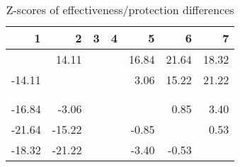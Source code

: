 \begin{table}[ht]
\centering
\begin{tabular}{rrrrrrr}
  \hline
1 & 2 & 3 & 4 & 5 & 6 & 7 \\ 
  \hline
 & 14.11 &  &  & 16.84 & 21.64 & 18.32 \\ 
  -14.11 &  &  &  & 3.06 & 15.22 & 21.22 \\ 
   &  &  &  &  &  &  \\ 
   &  &  &  &  &  &  \\ 
  -16.84 & -3.06 &  &  &  & 0.85 & 3.40 \\ 
  -21.64 & -15.22 &  &  & -0.85 &  & 0.53 \\ 
  -18.32 & -21.22 &  &  & -3.40 & -0.53 &  \\ 
   \hline
\end{tabular}
\caption{Z-scores of effectiveness/protection differences} 
\end{table}
